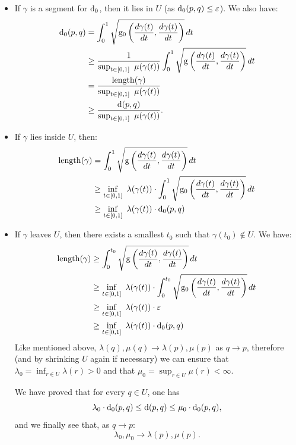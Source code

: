 \begin{itemize}
\item If $\gamma$ is a segment for $\mathrm{d}_0$, then it lies in $U$ (as $\mathrm{d}_0(p,q)\leq\varepsilon$). We also have:
%
\begin{align*}
\dis_0(p,q)&=\int_0^1\sqrt{\g_0\left(\frac{d\gamma(t)}{dt},\frac{d\gamma(t)}{dt}\right)}\, dt\\
&\geq \frac{1}{\sup_{t\in[0,1]}\ \mu(\gamma(t))}\int_0^1\sqrt{\g\left(\frac{d\gamma(t)}{dt},\frac{d\gamma(t)}{dt}\right)}\, dt\\
&=\frac{\length(\gamma)}{\sup_{t\in[0,1]}\ \mu(\gamma(t))}\\
&\geq \frac{\dis(p,q)}{\sup_{t\in[0,1]}\ \mu(\gamma(t))}.
\end{align*}
%
\item If $\gamma$ lies inside $U$, then:
%
\begin{align*}
\mathrm{length}(\gamma)&=\int_0^1\sqrt{\mathrm{g}\left(\frac{d\gamma(t)}{dt},\frac{d\gamma(t)}{dt}\right)}\, dt\\
&\geq \inf_{t\in[0,1]}\ \lambda(\gamma(t)) \cdot \int_0^1\sqrt{\mathrm{g}_0\left(\frac{d\gamma(t)}{dt},\frac{d\gamma(t)}{dt}\right)}\, dt\\
&\geq \inf_{t\in[0,1]}\ \lambda(\gamma(t))\cdot\mathrm{d}_0(p,q)
\end{align*}
%
\item If $\gamma$ leaves $U$, then there exists a smallest $t_0$ such that $\gamma(t_0)\notin U$. We have:
%
\begin{align*}
\length(\gamma)&\geq\int_0^{t_0}\sqrt{\g\left(\frac{d\gamma(t)}{dt},\frac{d\gamma(t)}{dt}\right)}\, dt\\
&\geq \inf_{t\in[0,1]}\ \lambda(\gamma(t))\cdot\int_0^{t_0}\sqrt{\g_0\left(\frac{d\gamma(t)}{dt},\frac{d\gamma(t)}{dt}\right)}\, dt\\
&\geq \inf_{t\in[0,1]}\ \lambda(\gamma(t))\cdot\eps\\
&\geq \inf_{t\in[0,1]}\ \lambda(\gamma(t))\cdot\dis_0(p,q)
\end{align*}
Like mentioned above, $\lambda(q),\mu(q)\rightarrow \lambda(p),\mu(p)$ as $q\rightarrow p$, therefore (and by shrinking $U$ again if necessary) we can ensure that $\lambda_0=\inf_{r\in U}\lambda(r)>0$ and that $\mu_0=\sup_{r\in U}\mu(r)<\infty$.

We have proved that for every $q\in U$, one has
$$\lambda_0\cdot\mathrm{d}_0(p,q)\leq \mathrm{d}(p,q)\leq\mu_0\cdot\mathrm{d}_0(p,q),$$
and we finally see that, as $q\rightarrow p$:
$$\lambda_0,\mu_0\rightarrow \lambda(p),\mu(p).$$
\end{itemize}


